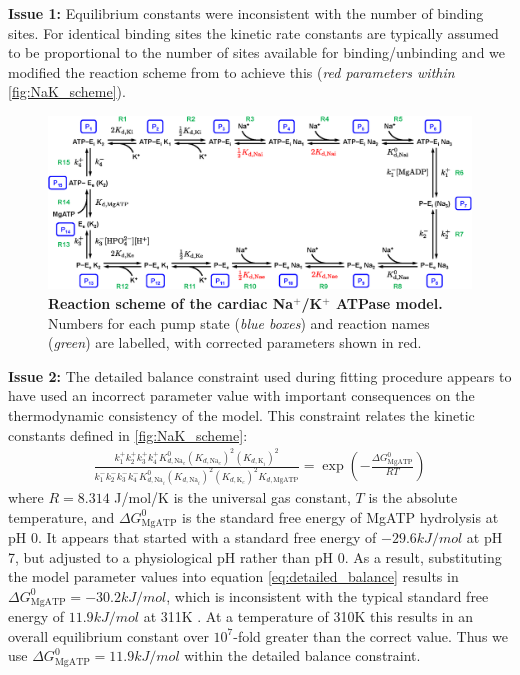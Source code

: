 \documentclass[fleqn,10pt]{physiome}
\begin{document}
\textbf{Issue 1:} Equilibrium constants were inconsistent with the number of binding sites. For identical binding sites the kinetic rate constants are typically assumed to be proportional to the number of sites available for binding/unbinding \citep{keener_mathematical_2009} and we modified the reaction scheme from \citet{terkildsen_balance_2007} to achieve this (\textit{red parameters within} \autoref{fig:NaK_scheme}).

\begin{figure}
\centering
\includegraphics[width=\linewidth]{Terkildsen_NaK_network.eps}
\caption{\textbf{Reaction scheme of the cardiac Na$^+$/K$^+$ ATPase model.} Numbers for each pump state (\textit{blue boxes}) and reaction names (\textit{green}) are labelled, with corrected parameters shown in red.}
\label{fig:NaK_scheme}
\end{figure}

\textbf{Issue 2:} The detailed balance constraint used during fitting procedure appears to have used an incorrect parameter value with important consequences on the thermodynamic consistency of the model. This constraint relates the kinetic constants defined in \autoref{fig:NaK_scheme}:
\begin{align}
	\frac{k_1^+ k_2^+ k_3^+ k_4^+ K_{d,\text{Na}_e}^0(K_{d,\text{Na}_e})^2 (K_{d,\text{K}_i})^2}
  {k_1^- k_2^- k_3^- k_4^- K_{d,\text{Na}_i}^0 (K_{d,\text{Na}_i})^2 (K_{d,\text{K}_e})^2 K_{d,\text{MgATP}}} = \exp\left( -\frac{\Delta G_\text{MgATP}^0}{RT} \right)
  \label{eq:detailed_balance}
\end{align}
where $R=8.314$ J/mol/K is the universal gas constant, $T$ is the absolute temperature, and $\Delta G_\mathrm{MgATP}^0$ is the standard free energy of MgATP hydrolysis at pH 0. It appears that \citet{terkildsen_balance_2007} started with a standard free energy of $-29.6\si{kJ/mol}$ at pH 7, but adjusted to a physiological pH rather than pH 0. As a result, substituting the model parameter values into equation \eqref{eq:detailed_balance} results in $\Delta G_\mathrm{MgATP}^0 = -30.2\si{kJ/mol}$, which is inconsistent with the typical standard free energy of $11.9\si{kJ/mol}$ at 311K \citep{tran_thermodynamic_2009,guynn_equilibrium_1973}. At a temperature of 310K this results in an overall equilibrium constant over $10^7$-fold greater than the correct value. Thus we use $\Delta G_\mathrm{MgATP}^0 = 11.9\si{kJ/mol}$ within the detailed balance constraint.
\end{document}
